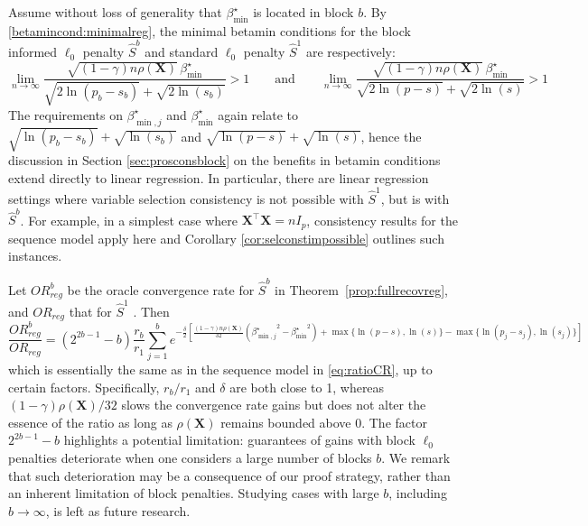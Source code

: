 \documentclass[aos]{imsart}
\theoremstyle{plain}
\newcommand{\bs}{\boldsymbol}
\begin{document}
\noindent Assume without loss of generality that $\beta_{\min}^{\star}$ is located in block $b$.  By \eqref{betamincond:minimalreg}, the minimal betamin conditions for the block informed $\ell_0$ penalty $\hat{S}^b$ and standard $\ell_0$ penalty $\hat{S}^1$ are respectively: 
$$\lim_{n\to \infty}\frac{\sqrt{(1-\gamma) n\rho(\bs X)}\,{\beta_{\min}^{\star}}}{\sqrt{2\ln(p_b-s_b)} + \sqrt{2\ln(s_b)}} >1 \qquad \mbox{and} \qquad \lim_{n\to \infty}\frac{\sqrt{(1-\gamma) n\rho(\bs X)}\,{\beta_{\min}^{\star}}}{\sqrt{2\ln(p-s)} + \sqrt{2\ln(s)}} >1$$
The requirements on $\beta_{\min,j}^\star$ and $\beta_{\min}^\star$ again relate to
$\sqrt{\ln(p_b-s_b)} + \sqrt{\ln(s_b)}$ and $\sqrt{\ln(p-s)} + \sqrt{\ln(s)}$, hence the discussion in Section \ref{sec:prosconsblock} on the benefits in betamin conditions extend directly to linear regression.
In particular, there are linear regression settings where variable selection consistency is not possible with $\hat{S}^1$, but is with $\hat{S}^b$. For example, in a simplest case where $\bs X^\top \bs X=n I_p$, consistency results for the sequence model apply here
and Corollary \ref{cor:selconstimpossible} outlines such instances.

Let ${OR}^b_{reg}$ be the oracle convergence rate for $\hat{S}^{b}$ in Theorem~\ref{prop:fullrecovreg}, and ${OR}_{reg}$ that for $\hat{S}^{1}$ . Then
\begin{equation*}
    \frac{{OR}^b_{reg}}{{OR}_{reg}}=(2^{2b-1}-b)\frac{r_b}{r_1}\sum_{j=1}^be^{-\frac{\delta}{2}\left[\frac{(1-\gamma) n\rho(\bs X)}{32}\left({\beta^\star_{\min,j}}^2-{\beta_{\min}^\star}^2\right)+\max\{\ln(p-s),\ln(s)\}-\max\{\ln(p_j-s_j),\ln(s_j)\}\right]}
\end{equation*}
which is essentially the same as in the sequence model %
in \eqref{eq:ratioCR}, up to certain %
factors. 
Specifically, $r_b/r_1$ and $\delta$ are both close to 1, whereas $(1-\gamma) \rho(\bs X)/32$ slows the convergence rate gains %
but does not alter the essence of the ratio %
as long as $\rho(\bs X)$ remains bounded above 0. The factor $2^{2b-1}-b$ highlights a potential limitation: guarantees of gains with block $\ell_0$ penalties deteriorate when one considers a large number of blocks $b$.
We remark that such deterioration may be a consequence of our proof strategy, rather than an inherent limitation of block penalties. Studying cases with large $b$, including $b \to \infty$, is left as future research.
\end{document}
